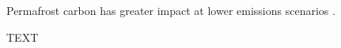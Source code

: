 \documentclass[essd, manuscript]{copernicus}
\begin{document}
Permafrost carbon has greater impact at lower emissions scenarios \citep{burke_2017_quantifying, macdougall_2012_significant, macdougall_2013_if} .


\conclusions  %
TEXT


















\end{document}
